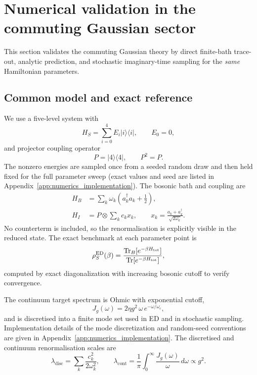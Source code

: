 \section{Numerical validation in the commuting Gaussian sector}
\label{sec:numerical}

This section validates the commuting Gaussian theory by direct finite-bath trace-out,
analytic prediction, and stochastic imaginary-time sampling for the \emph{same}
Hamiltonian parameters.

\subsection{Common model and exact reference}

We use a five-level system with
\begin{equation}
H_S=\sum_{i=0}^{4}E_i\lvert i\rangle\!\langle i\rvert,\qquad E_0=0,
\end{equation}
and projector coupling operator
\begin{equation}
P=\lvert 4\rangle\!\langle 4\rvert,\qquad P^2=P.
\end{equation}
The nonzero energies are sampled once from a seeded random draw and then held
fixed for the full parameter sweep (exact values and seed are listed in
Appendix~\ref{app:numerics_implementation}). The bosonic bath and coupling are
\begin{align}
H_B &= \sum_k\omega_k\!\left(a_k^\dagger a_k+\tfrac12\right),\\
H_I &= P\otimes\sum_k c_k x_k,\qquad
x_k=\frac{a_k+a_k^\dagger}{\sqrt{2\omega_k}}.
\end{align}
No counterterm is included, so the renormalisation is explicitly visible in
the reduced state. The exact benchmark at each parameter point is
\begin{equation}
\rho_S^{\mathrm{ED}}(\beta)
=
\frac{\mathrm{Tr}_B[e^{-\beta H_{\mathrm{tot}}}]}{\mathrm{Tr}[e^{-\beta H_{\mathrm{tot}}}]},
\label{eq:rho_ed_definition}
\end{equation}
computed by exact diagonalization with increasing bosonic cutoff to verify
convergence.

The continuum target spectrum is Ohmic with exponential cutoff,
\begin{equation}
J_g(\omega)=2\eta g^2\,\omega\,e^{-\omega/\omega_c},
\end{equation}
and is discretised into a finite mode set used in ED and in stochastic sampling.
Implementation details of the mode discretization and random-seed conventions
are given in Appendix~\ref{app:numerics_implementation}.
The discretised and continuum renormalisation scales are
\begin{equation}
\lambda_{\mathrm{disc}}
=
\sum_k\frac{c_k^2}{2\omega_k^2},
\qquad
\lambda_{\mathrm{cont}}
=
\frac{1}{\pi}\int_0^\infty\frac{J_g(\omega)}{\omega}\,d\omega
\propto g^2.
\label{eq:lambda_defs}
\end{equation}

